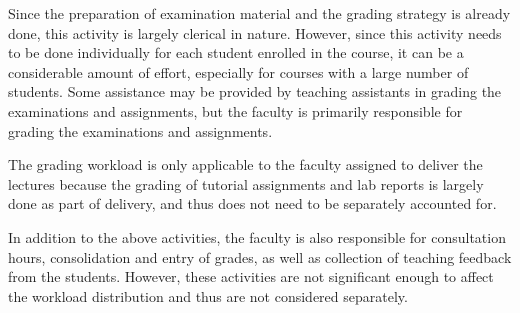 \begin{enumerate}
        Since the preparation of examination material and the grading strategy is already done, this activity is largely clerical in nature. However, since this activity needs to be done individually for each student enrolled in the course, it can be a considerable amount of effort, especially for courses with a large number of students. Some assistance may be provided by teaching assistants in grading the examinations and assignments, but the faculty is primarily responsible for grading the examinations and assignments.

        The grading workload is only applicable to the faculty assigned to deliver the lectures because the grading of tutorial assignments and lab reports is largely done as part of delivery, and thus does not need to be separately accounted for.

\end{enumerate}

In addition to the above activities, the faculty is also responsible for consultation hours, consolidation and entry of grades, as well as collection of teaching feedback from the students. However, these activities are not significant enough to affect the workload distribution and thus are not considered separately.


